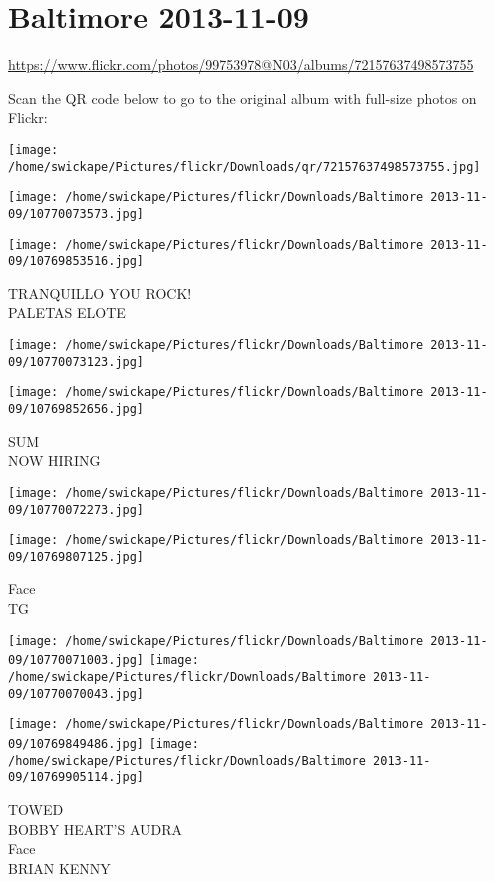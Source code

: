 \documentclass[10pt,letterpaper]{article}
\title{}
\author{}
\date{}
\begin{document}
\section*{Baltimore 2013-11-09}

\url{https://www.flickr.com/photos/99753978@N03/albums/72157637498573755}

Scan the QR code below to go to the original album with full-size photos on Flickr:

\texttt{[image: /home/swickape/Pictures/flickr/Downloads/qr/72157637498573755.jpg]}
\pagebreak

\texttt{[image: /home/swickape/Pictures/flickr/Downloads/Baltimore 2013-11-09/10770073573.jpg]}

\vspace{0.25in}
\texttt{[image: /home/swickape/Pictures/flickr/Downloads/Baltimore 2013-11-09/10769853516.jpg]}

TRANQUILLO YOU ROCK!\\
PALETAS ELOTE
\pagebreak

\texttt{[image: /home/swickape/Pictures/flickr/Downloads/Baltimore 2013-11-09/10770073123.jpg]}

\vspace{0.25in}
\texttt{[image: /home/swickape/Pictures/flickr/Downloads/Baltimore 2013-11-09/10769852656.jpg]}

SUM\\
NOW HIRING
\pagebreak

\texttt{[image: /home/swickape/Pictures/flickr/Downloads/Baltimore 2013-11-09/10770072273.jpg]}

\vspace{0.25in}
\texttt{[image: /home/swickape/Pictures/flickr/Downloads/Baltimore 2013-11-09/10769807125.jpg]}

Face\\
TG
\pagebreak

\texttt{[image: /home/swickape/Pictures/flickr/Downloads/Baltimore 2013-11-09/10770071003.jpg]}
\texttt{[image: /home/swickape/Pictures/flickr/Downloads/Baltimore 2013-11-09/10770070043.jpg]}

\texttt{[image: /home/swickape/Pictures/flickr/Downloads/Baltimore 2013-11-09/10769849486.jpg]}
\texttt{[image: /home/swickape/Pictures/flickr/Downloads/Baltimore 2013-11-09/10769905114.jpg]}

TOWED\\
BOBBY HEART'S AUDRA\\
Face\\
BRIAN KENNY
\pagebreak
\end{document}

